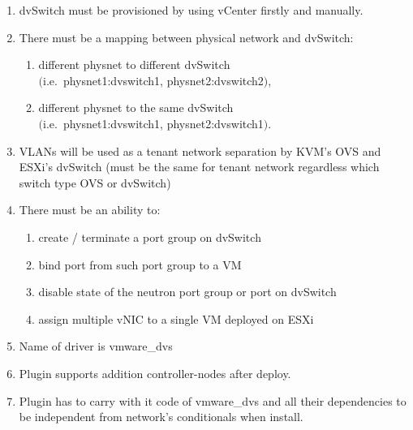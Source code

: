 \documentclass{article}
\begin{document}
\begin{enumerate}

\item dvSwitch must be provisioned by using vCenter firstly and manually.

\item There must be a mapping between physical network and dvSwitch:

\begin{enumerate}

\item different physnet to different dvSwitch \\ $($i.e.~physnet1:dvswitch1, physnet2:dvswitch2$)$,

\item different physnet to the same dvSwitch \\ $($i.e.~physnet1:dvswitch1, physnet2:dvswitch1$)$.

\end{enumerate}

\item VLANs will be used as a tenant network separation by KVM’s OVS and ESXi’s
     dvSwitch (must be the same for tenant network regardless which switch type OVS
     or dvSwitch)

\item There must be an ability to:

\begin{enumerate}

\item create / terminate a port group on dvSwitch

\item bind port from such port group to a VM

\item disable state of the neutron port group or port on dvSwitch

\item assign multiple vNIC to a single VM deployed on ESXi

\end{enumerate}

\item Name of driver is vmware\_dvs

\item Plugin supports addition controller-nodes after deploy.

\item Plugin has to carry with it code of vmware\_dvs and all their dependencies to be independent from network’s conditionals when install.

\end{enumerate}
\end{document}
